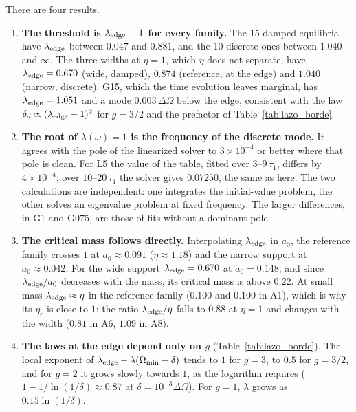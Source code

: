 \documentclass[11pt,a4paper]{article}
\begin{document}
There are four results.
\begin{enumerate}
\item \textbf{The threshold is $\lambda_{\rm edge}=1$ for every family.} The 15 damped equilibria have
$\lambda_{\rm edge}$ between $0.047$ and $0.881$, and the 10 discrete ones between $1.040$ and $\infty$.
The three widths at $\eta=1$, which $\eta$ does not separate, have $\lambda_{\rm edge}=0.670$ (wide,
damped), $0.874$ (reference, at the edge) and $1.040$ (narrow, discrete). G15, which the
time evolution leaves marginal, has $\lambda_{\rm edge}=1.051$ and a mode $0.003\,\Delta\Omega$ below the
edge, consistent with the law $\delta_d\propto(\lambda_{\rm edge}-1)^2$ for $g=3/2$ and the prefactor of
Table~\ref{tab:lazo_borde}.
\item \textbf{The root of $\lambda(\omega)=1$ is the frequency of the discrete mode.} It agrees with the
pole of the linearized solver to $3\times10^{-4}$ or better where that pole is clean. For L5 the
value of the table, fitted over $3$--$9\,\tau_1$, differs by $4\times10^{-4}$; over $10$--$20\,\tau_1$ the
solver gives $0.07250$, the same as here. The two calculations are
independent: one integrates the initial-value problem, the other solves an eigenvalue
problem at fixed frequency. The larger differences, in G1 and G075, are those of fits
without a dominant pole.
\item \textbf{The critical mass follows directly.} Interpolating $\lambda_{\rm edge}$ in $a_0$, the reference
family crosses $1$ at $a_0\approx0.091$ ($\eta\approx1.18$) and the narrow support at $a_0\approx0.042$. For
the wide support $\lambda_{\rm edge}=0.670$ at $a_0=0.148$, and since $\lambda_{\rm edge}/a_0$ decreases with the
mass, its critical mass is above $0.22$. At small mass $\lambda_{\rm edge}\approx\eta$ in the reference family
($0.100$ and $0.100$ in A1), which is why its $\eta_c$ is close to $1$; the ratio $\lambda_{\rm edge}/\eta$
falls to $0.88$ at $\eta=1$ and changes with the width ($0.81$ in A6, $1.09$ in A8).
\item \textbf{The laws at the edge depend only on $g$} (Table~\ref{tab:lazo_borde}). The local
exponent of $\lambda_{\rm edge}-\lambda(\Omega_{\min}-\delta)$ tends to $1$ for $g=3$, to $0.5$ for $g=3/2$, and for
$g=2$ it grows slowly towards $1$, as the logarithm requires ($1-1/\ln(1/\delta)\approx0.87$ at
$\delta=10^{-3}\Delta\Omega$). For $g=1$, $\lambda$ grows as $0.15\ln(1/\delta)$.
\end{enumerate}
\end{document}
